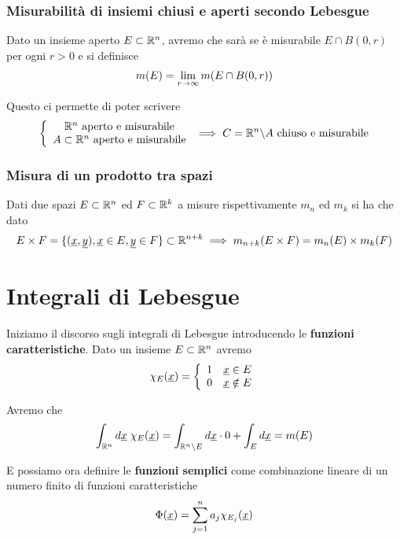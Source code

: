 \subsubsection{Misurabilità di insiemi chiusi e aperti secondo Lebesgue}

Dato un insieme aperto $E\subset \mathbb{R}^n$, avremo che sarà \Lmis se è misurabile $E\cap B(0,r)$ per ogni $r>0$ e si definisce
\begin{align}
	m(E)= \underset{r \rightarrow \infty}{\lim} \, m(E\cap B(0,r))
\end{align}

Questo ci permette di poter scrivere
\begin{align}
	\left\{\begin{array}{cc} \mathbb{R}^n \text{ aperto e misurabile} \\ A\subset \mathbb{R}^n \text{ aperto e misurabile} \end{array}\right. \implies C= \mathbb{R}^n \backslash A \text{ chiuso e misurabile} \nonumber
\end{align}

\subsubsection{Misura di un prodotto tra spazi}
Dati due spazi $E\subset \mathbb{R}^n$ ed $F\subset \mathbb{R}^k$ a misure rispettivamente $m_n$ ed $m_k$ si ha che dato
\begin{align}
	E \times F = \{ (\underline{x},\underline{y}) , \underline{x} \in E, \underline{y} \in F  \}\subset \mathbb{R}^{n+k} \implies m_{n+k}(E\times F) = m_n(E)\times m_k(F)
\end{align}

\section{Integrali di Lebesgue}

Iniziamo il discorso sugli integrali di Lebesgue introducendo le \textbf{funzioni caratteristiche}. Dato un insieme $E\subset \mathbb{R}^n$ avremo
\begin{align}
	\chi_E(\underline{x})= \left\{\begin{array}{cc} 1 \quad \underline{x}\in E \\ 0 \quad \underline{x} \notin E \end{array}\right.
\end{align}

Avremo che
\begin{align}
	\int_{\mathbb{R}^n} d\underline{x} \; \chi_E(\underline{x})= \int_{\mathbb{R}^n \backslash E} d\underline{x} \cdot 0 + \int_{E} d\underline{x}  = m(E)
\end{align}

E possiamo ora definire le \textbf{funzioni semplici} come combinazione lineare di un numero finito di funzioni caratteristiche
\begin{align}
	\Phi(\underline{x}) = \sum_{j=1}^{n} a_j \chi_{E_j}(\underline{x})
\end{align}

